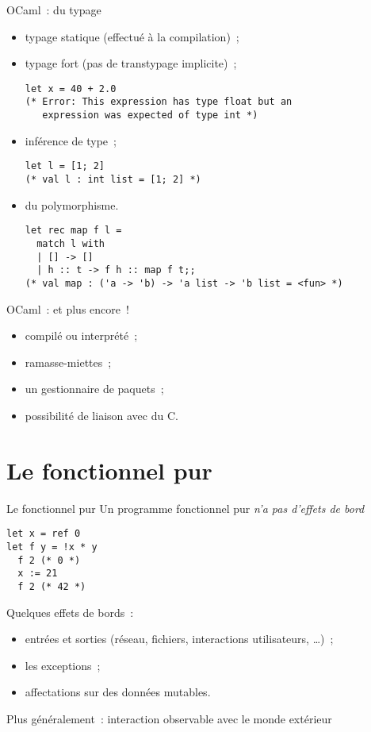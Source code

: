 \documentclass[10pt]{beamer}
\begin{document}
\begin{frame}[fragile]{OCaml~: du typage}
  \begin{itemize}
  \item typage statique (effectué à la compilation)~;
  \item typage fort (pas de transtypage implicite)~;
\begin{verbatim}
let x = 40 + 2.0
(* Error: This expression has type float but an
   expression was expected of type int *)
\end{verbatim}
  \item inférence de type~;
\begin{verbatim}
let l = [1; 2]
(* val l : int list = [1; 2] *)
\end{verbatim}
  \item du polymorphisme.
\begin{verbatim}
let rec map f l =
  match l with
  | [] -> []
  | h :: t -> f h :: map f t;;
(* val map : ('a -> 'b) -> 'a list -> 'b list = <fun> *)
    \end{verbatim}
  \end{itemize}
\end{frame}

\begin{frame}{OCaml~: et plus encore~!}
  \begin{itemize}
  \item compilé ou interprété~;
  \item ramasse-miettes~;
  \item un gestionnaire de paquets~;
  \item possibilité de liaison avec du C.
  \end{itemize}
\end{frame}

\section{Le fonctionnel pur}

\begin{frame}[fragile]{Le fonctionnel pur}
  Un programme fonctionnel pur \emph{n'a pas d'effets de bord}
\begin{verbatim}
let x = ref 0
let f y = !x * y
  f 2 (* 0 *)
  x := 21
  f 2 (* 42 *)
\end{verbatim}

  Quelques effets de bords~:
  \begin{itemize}
  \item entrées et sorties (réseau, fichiers, interactions
    utilisateurs, …)~;
  \item les exceptions~;
  \item affectations sur des données mutables.
  \end{itemize}
  Plus généralement~: interaction observable avec le monde extérieur
\end{frame}
\end{document}
